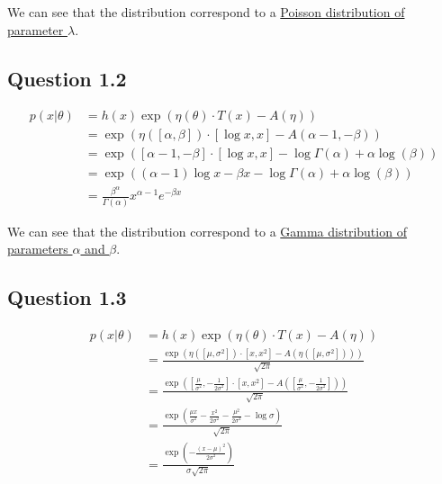 \documentclass{article}
\begin{document}
We can see that the distribution correspond to a \underline{Poisson distribution of parameter $\lambda$}.

\subsection{Question 1.2}

\begin{equation}
    \begin{split}
        p(x|\theta) & = h(x) \exp(\eta(\theta) \cdot T(x) - A(\eta))                                            \\
                    & = \exp(\eta([\alpha, \beta]) \cdot [\log x, x] - A(\alpha - 1, -\beta))                   \\
                    & = \exp([\alpha - 1, -\beta] \cdot [\log x, x] - \log \Gamma(\alpha) + \alpha \log(\beta)) \\
                    & = \exp((\alpha - 1) \log x - \beta x - \log \Gamma(\alpha) + \alpha \log(\beta))          \\
                    & = \frac{\beta^\alpha}{\Gamma(\alpha)} x^{\alpha - 1} e^{-\beta x}
    \end{split}
\end{equation}

We can see that the distribution correspond to a \underline{Gamma distribution of parameters $\alpha$ and $\beta$}.

\subsection{Question 1.3}

\begin{equation}
    \begin{split}
        p(x|\theta) & = h(x) \exp(\eta(\theta) \cdot T(x) - A(\eta))                                                                                                 \\
                    & = \frac{\exp(\eta([\mu, \sigma^2]) \cdot [x, x^2] - A(\eta([\mu, \sigma^2])))}{\sqrt{2 \pi}}                                                   \\
                    & = \frac{\exp([\frac{\mu}{\sigma^2}, - \frac{1}{2 \sigma^2}] \cdot [x, x^2] - A([\frac{\mu}{\sigma^2}, - \frac{1}{2 \sigma^2}]))}{\sqrt{2 \pi}} \\
                    & = \frac{\exp(\frac{\mu x}{\sigma^2} - \frac{x^2}{2 \sigma^2} - \frac{\mu^2}{2 \sigma^2} - \log \sigma)}{\sqrt{2 \pi}}                          \\
                    & = \frac{\exp(- \frac{(x - \mu)^2}{2 \sigma^2})}{\sigma \sqrt{2 \pi}}
    \end{split}
\end{equation}
\end{document}
